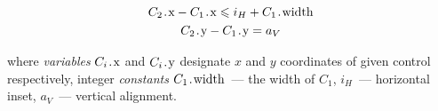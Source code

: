 \begin{gather*}
  C_2\prg{.x} - C_1\prg{.x} \leq i_H + C_1\prg{.width}\\
  C_2\prg{.y} - C_1\prg{.y} = a_V
\end{gather*}

where \emph{variables} $C_i\prg{.x}$ and $C_i\prg{.y}$ designate $x$ and $y$ coordinates of given control respectively, integer
\emph{constants} $C_1\prg{.width}$~--- the width of $C_1$, $i_H$~--- horizontal inset, $a_V$~--- vertical alignment.

\begin{comment}
The set of layout instances in fact specifies a number of \emph{integer linear constraints} which have to be solved in order to obtain the
final, absolute coordinates of the controls. Indeed, let us introduce the notations for integer constants and \emph{variables} which
values have to be defined as  a result of constraint solving:

\begin{itemize}
\item $C\prg{.width}$,  $C\prg{.height}$~--- the width and height of a GUI control $C$ (integer constant for real GUI controls and a \emph{variable} for virtual GUI controls);

\item $C\prg{.x}$,  $C\prg{.y}$~--- the $X$- and $Y$-coordinates of a GUI control $C$ (a \emph{variable} for each GUI control);
\item $a_H$, $a_V$~--- the horizontal/vertical alignments between two GUI controls (integer constant);
\item $i_H$, $i_V$~--- the vertical/horizontal insets between two GUI controls (integer constants);
\item $ind$~--- the indent between two GUI controls (integer constant);
\item $W$, $H$~--- the width and the height of enclosing panel (integer constants).
\end{itemize}


\end{comment}
